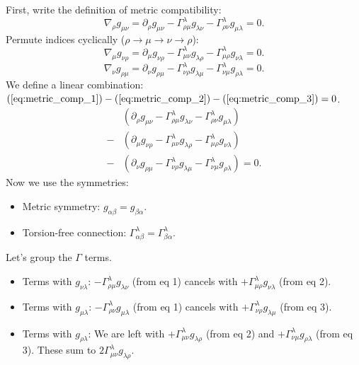 \documentclass[11pt, a4paper]{report}
\begin{document}
First, write the definition of metric compatibility:
\begin{equation}
\label{eq:metric_comp_1}
\nabla_\rho g_{\mu\nu} = \partial_\rho g_{\mu\nu} - \Gamma^\lambda_{\rho\mu} g_{\lambda\nu} - \Gamma^\lambda_{\rho\nu} g_{\mu\lambda} = 0.
\end{equation}
Permute indices cyclically (\(\rho \to \mu \to \nu \to \rho\)):
\begin{equation}
\label{eq:metric_comp_2}
\nabla_\mu g_{\nu\rho} = \partial_\mu g_{\nu\rho} - \Gamma^\lambda_{\mu\nu} g_{\lambda\rho} - \Gamma^\lambda_{\mu\rho} g_{\nu\lambda} = 0.
\end{equation}
\begin{equation}
\label{eq:metric_comp_3}
\nabla_\nu g_{\rho\mu} = \partial_\nu g_{\rho\mu} - \Gamma^\lambda_{\nu\rho} g_{\lambda\mu} - \Gamma^\lambda_{\nu\mu} g_{\rho\lambda} = 0.
\end{equation}
We define a linear combination: \((\ref{eq:metric_comp_1}) - (\ref{eq:metric_comp_2}) - (\ref{eq:metric_comp_3}) = 0\).
\begin{align*}
&\left(\partial_\rho g_{\mu\nu} - \Gamma^\lambda_{\rho\mu} g_{\lambda\nu} - \Gamma^\lambda_{\rho\nu} g_{\mu\lambda}\right)  \\
-& \left(\partial_\mu g_{\nu\rho} - \Gamma^\lambda_{\mu\nu} g_{\lambda\rho} - \Gamma^\lambda_{\mu\rho} g_{\nu\lambda}\right) \\
-& \left(\partial_\nu g_{\rho\mu} - \Gamma^\lambda_{\nu\rho} g_{\lambda\mu} - \Gamma^\lambda_{\nu\mu} g_{\rho\lambda}\right) = 0.
\end{align*}
Now we use the symmetries:
\begin{itemize}
    \item Metric symmetry: \(g_{\alpha\beta} = g_{\beta\alpha}\).
    \item Torsion-free connection: \(\Gamma^\lambda_{\alpha\beta} = \Gamma^\lambda_{\beta\alpha}\).
\end{itemize}
Let's group the \(\Gamma\) terms.
\begin{itemize}
    \item Terms with \(g_{\nu\lambda}\): \(-\Gamma^\lambda_{\rho\mu} g_{\lambda\nu}\) (from eq 1) cancels with \(+\Gamma^\lambda_{\mu\rho} g_{\nu\lambda}\) (from eq 2).
    \item Terms with \(g_{\mu\lambda}\): \(-\Gamma^\lambda_{\rho\nu} g_{\mu\lambda}\) (from eq 1) cancels with \(+\Gamma^\lambda_{\nu\rho} g_{\lambda\mu}\) (from eq 3).
    \item Terms with \(g_{\rho\lambda}\): We are left with \(+\Gamma^\lambda_{\mu\nu} g_{\lambda\rho}\) (from eq 2) and \(+\Gamma^\lambda_{\nu\mu} g_{\rho\lambda}\) (from eq 3). These sum to \(2\Gamma^\lambda_{\mu\nu} g_{\lambda\rho}\).
\end{itemize}
\end{document}
